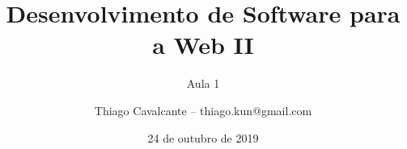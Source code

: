 \title{Desenvolvimento de Software para a Web II}
\subtitle{Aula 1}
\date{24 de outubro de 2019}
\author{Thiago Cavalcante  -- thiago.kun@gmail.com}
